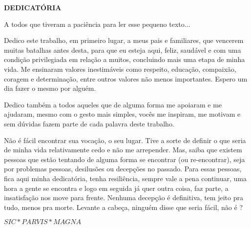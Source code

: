 \begin{center}
\textbf{DEDICATÓRIA}
\end{center}

$\!$\\


A todos que tiveram a paciência para ler esse pequeno texto...
\vspace{1cm}

Dedico este trabalho, em primeiro lugar, a meus pais e familiares, que vencerem muitas batalhas antes desta, para que eu esteja aqui, feliz, saudável e com uma condição privilegiada em relação a muitos, concluindo mais uma etapa de minha vida. Me ensinaram valores inestimáveis como respeito, educação, compaixão, coragem e determinação, entre outros valores não menos importantes. Espero um dia fazer o mesmo por alguém.

Dedico também a todos aqueles que de alguma forma me apoiaram e me ajudaram, mesmo com o gesto mais simples, vocês me inspiram, me motivam e sem dúvidas fazem parte de cada palavra deste trabalho.


Não é fácil encontrar sua vocação, o seu lugar. Tive a sorte de definir o que seria de minha vida relativamente cedo e não me arrepender. Mas, saiba que existem pessoas que estão tentando de alguma forma se encontrar (ou re-encontrar), seja por problemas pessoas, desilusões ou decepções no passado. Para essas pessoas, fica aqui minha dedicatória, tenha resiliência, sempre vale a pena continuar, uma hora a gente se encontra e logo em seguida já quer outra coisa, faz parte, a insatisfação nos move para frente. Nenhuma decepção é definitiva, tem jeito pra tudo, menos pra morte. Levante a cabeça, ninguém disse que seria fácil, não é ?

\vfill

$SIC * PARVIS * MAGNA$